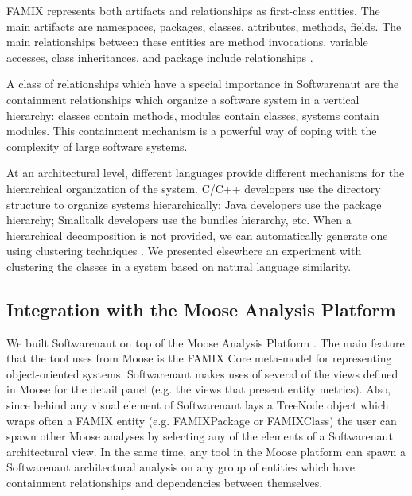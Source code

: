 \documentclass[preprint,12pt]{elsarticle}
\begin{document}
FAMIX represents both artifacts and relationships as first-class entities. The main artifacts are namespaces, packages, classes, attributes, methods, fields. The main relationships between these entities are method invocations, variable accesses, class inheritances, and package include relationships \cite{tichelaar-thesis}.

A class of relationships which have a special importance in Softwarenaut are the containment relationships which organize a software system in a vertical hierarchy: classes contain methods, modules contain classes, systems contain modules. This containment mechanism is a powerful way of coping with the complexity of large software systems.

At an architectural level, different languages provide different mechanisms for the hierarchical organization of the system. C/C++ developers use the directory structure to organize systems hierarchically; Java developers use the package hierarchy; Smalltalk developers use the bundles hierarchy, etc. 
When a hierarchical decomposition is not provided, we can automatically generate one using clustering techniques \cite{koschke-thesis}. We presented elsewhere an experiment with clustering the classes in a system based on natural language similarity\cite{Lung05a}.



\subsection {Integration with the Moose Analysis Platform}
We built Softwarenaut on top of the Moose Analysis Platform \cite{nier-story}. The main feature that the tool uses from Moose is the FAMIX Core meta-model for representing object-oriented systems. 
Softwarenaut makes uses of several of the views defined in Moose for the detail panel (e.g. the views that present entity metrics). Also, since behind any visual element of Softwarenaut lays a TreeNode object which wraps often a FAMIX entity (e.g. FAMIXPackage or FAMIXClass) the user can spawn other Moose analyses by selecting any of the elements of a Softwarenaut architectural view. In the same time, any tool in the Moose platform can spawn a Softwarenaut architectural analysis on any group of entities which have containment relationships and dependencies between themselves.
\end{document}
